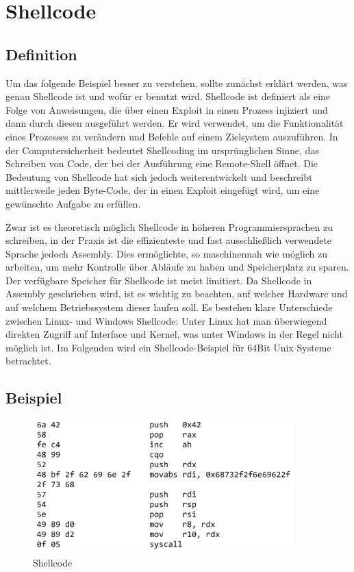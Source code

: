\section{Shellcode}
\subsection{Definition}
Um das folgende Beispiel besser zu verstehen, sollte zunächst erklärt werden, was genau Shellcode ist und wofür er benutzt wird.
Shellcode ist definiert als eine Folge von Anweisungen, die über einen Exploit in einen Prozess injiziert und
dann durch diesen ausgeführt werden. Er wird verwendet, um die Funktionalität eines Prozesses zu verändern und
Befehle auf einem Zielsystem auszuführen. In der Computersicherheit bedeutet Shellcoding im ursprünglichen Sinne,
das Schreiben von Code, der bei der Ausführung eine Remote-Shell öffnet. Die Bedeutung von Shellcode hat sich jedoch weiterentwickelt und
beschreibt mittlerweile jeden Byte-Code, der in einen Exploit eingefügt wird, um eine gewünschte Aufgabe zu erfüllen.

Zwar ist es theoretisch möglich Shellcode in höheren Programmiersprachen zu schreiben, in der Praxis ist die effizienteste und
fast ausschließlich verwendete Sprache jedoch Assembly. Dies ermöglichte, so maschinennah wie möglich zu arbeiten,
um mehr Kontrolle über Abläufe zu haben und Speicherplatz zu sparen. Der verfügbare Speicher für Shellcode ist meist limitiert.
Da Shellcode in Assembly geschrieben wird, ist es wichtig zu beachten, auf welcher Hardware und auf welchem Betriebssystem dieser laufen soll.
Es bestehen klare Unterschiede zwischen Linux- und Windows Shellcode: Unter Linux hat man überwiegend direkten Zugriff auf Interface und Kernel,
was unter Windows in der Regel nicht möglich ist. Im Folgenden wird ein Shellcode-Beispiel für 64Bit Unix Systeme betrachtet. \cite{tutorial1}

\subsection{Beispiel}
\begin{figure}[h]
    \centering
    \includegraphics[width=0.9\textwidth,height=0.75\textheight,keepaspectratio]{images/shellstorm.png}
    \caption{Shellcode}
\end{figure}

